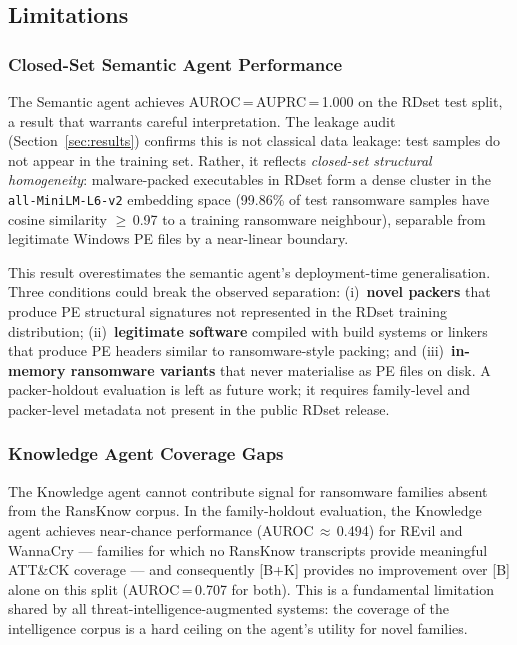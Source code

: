 \documentclass[journal]{IEEEtran}
\begin{document}
\subsection{Limitations}

\subsubsection{Closed-Set Semantic Agent Performance}

The Semantic agent achieves AUROC\,=\,AUPRC\,=\,1.000 on the RDset test split, a result
that warrants careful interpretation.
The leakage audit (Section~\ref{sec:results}) confirms this is not classical data leakage:
test samples do not appear in the training set.
Rather, it reflects \emph{closed-set structural homogeneity}: malware-packed executables
in RDset form a dense cluster in the \texttt{all-MiniLM-L6-v2} embedding space
(99.86\% of test ransomware samples have cosine similarity $\geq$\,0.97 to a training
ransomware neighbour), separable from legitimate Windows PE files by a near-linear
boundary.

This result overestimates the semantic agent's deployment-time generalisation.
Three conditions could break the observed separation:
(i)~\textbf{novel packers} that produce PE structural signatures not represented in the
RDset training distribution;
(ii)~\textbf{legitimate software} compiled with build systems or linkers that produce PE
headers similar to ransomware-style packing; and
(iii)~\textbf{in-memory ransomware variants} that never materialise as PE files on disk.
A packer-holdout evaluation is left as future work; it requires family-level and
packer-level metadata not present in the public RDset release.

\subsubsection{Knowledge Agent Coverage Gaps}

The Knowledge agent cannot contribute signal for ransomware families absent from the
RansKnow corpus.
In the family-holdout evaluation, the Knowledge agent achieves near-chance performance
(AUROC\,$\approx$\,0.494) for REvil and WannaCry --- families for which no RansKnow
transcripts provide meaningful ATT\&CK coverage --- and consequently [B+K] provides no
improvement over [B] alone on this split (AUROC\,=\,0.707 for both).
This is a fundamental limitation shared by all threat-intelligence-augmented systems:
the coverage of the intelligence corpus is a hard ceiling on the agent's utility for
novel families.
\end{document}
